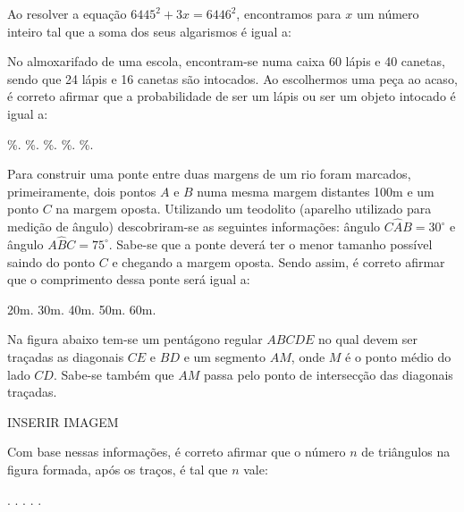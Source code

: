 \begin{question}%
Ao resolver a equação \(6445^2 + 3x = 6446^2\), encontramos para \(x\) um número inteiro tal que a soma dos seus algarismos é igual a:
    \begin{tasks}
    \end{tasks}
\end{question}

\begin{question}%
No almoxarifado de uma escola, encontram-se numa caixa 60 lápis e 40 canetas, sendo que 24 lápis e 16 canetas são intocados. Ao escolhermos uma peça ao acaso, é correto afirmar que a probabilidade de ser um lápis ou ser um objeto intocado é igual a:
    \begin{tasks}
        \%.
        \%.
        \%.
        \%.
        \%.
    \end{tasks}
\end{question}

\begin{question}%
Para construir uma ponte entre duas margens de um rio foram marcados, primeiramente, dois pontos \(A\) e \(B\) numa mesma margem distantes 100m e um ponto \(C\) na margem oposta. Utilizando um teodolito (aparelho utilizado para medição de ângulo) descobriram-se as seguintes informações: ângulo \(C\hat{A}B = 30^\circ\) e ângulo \(A\hat{B}C = 75^\circ\). Sabe-se que a ponte deverá ter o menor tamanho possível saindo do ponto \(C\) e chegando a margem oposta. Sendo assim, é correto afirmar que o comprimento dessa ponte será igual a:
    \begin{tasks}
        \task 20m.
        \task 30m.
        \task 40m.
        \task 50m.
        \task 60m.
    \end{tasks}
\end{question}

\begin{question}%
Na figura abaixo tem-se um pentágono regular \(ABCDE\) no qual devem ser traçadas as diagonais \(CE\) e \(BD\) e um segmento \(AM\), onde \(M\) é o ponto médio do lado \(CD\). Sabe-se também que \(AM\) passa pelo ponto de intersecção das diagonais traçadas.

INSERIR IMAGEM

Com base nessas informações, é correto afirmar que o número \(n\) de triângulos na figura formada, após os traços, é tal que \(n\) vale:
    \begin{tasks}
        .
        .
        .
        .
        .
    \end{tasks}
\end{question}


